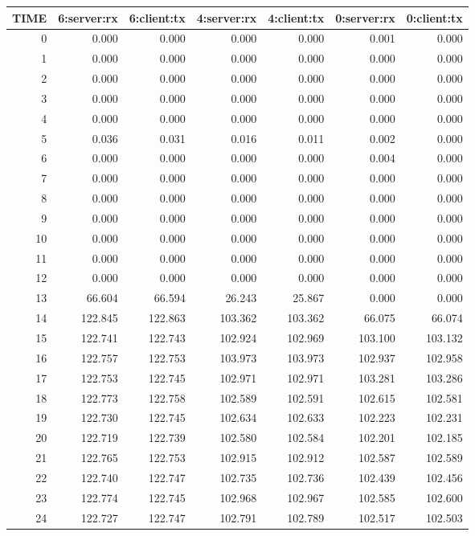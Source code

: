 \begin{tabular}{|rrrrrrr|}
\hline
TIME & 6:server:rx & 6:client:tx & 4:server:rx & 4:client:tx & 0:server:rx & 0:client:tx\\
\hline
0 & 0.000 & 0.000 & 0.000 & 0.000 & 0.001 & 0.000\\
1 & 0.000 & 0.000 & 0.000 & 0.000 & 0.000 & 0.000\\
2 & 0.000 & 0.000 & 0.000 & 0.000 & 0.000 & 0.000\\
3 & 0.000 & 0.000 & 0.000 & 0.000 & 0.000 & 0.000\\
4 & 0.000 & 0.000 & 0.000 & 0.000 & 0.000 & 0.000\\
5 & 0.036 & 0.031 & 0.016 & 0.011 & 0.002 & 0.000\\
6 & 0.000 & 0.000 & 0.000 & 0.000 & 0.004 & 0.000\\
7 & 0.000 & 0.000 & 0.000 & 0.000 & 0.000 & 0.000\\
8 & 0.000 & 0.000 & 0.000 & 0.000 & 0.000 & 0.000\\
9 & 0.000 & 0.000 & 0.000 & 0.000 & 0.000 & 0.000\\
10 & 0.000 & 0.000 & 0.000 & 0.000 & 0.000 & 0.000\\
11 & 0.000 & 0.000 & 0.000 & 0.000 & 0.000 & 0.000\\
12 & 0.000 & 0.000 & 0.000 & 0.000 & 0.000 & 0.000\\
13 & 66.604 & 66.594 & 26.243 & 25.867 & 0.000 & 0.000\\
14 & 122.845 & 122.863 & 103.362 & 103.362 & 66.075 & 66.074\\
15 & 122.741 & 122.743 & 102.924 & 102.969 & 103.100 & 103.132\\
16 & 122.757 & 122.753 & 103.973 & 103.973 & 102.937 & 102.958\\
17 & 122.753 & 122.745 & 102.971 & 102.971 & 103.281 & 103.286\\
18 & 122.773 & 122.758 & 102.589 & 102.591 & 102.615 & 102.581\\
19 & 122.730 & 122.745 & 102.634 & 102.633 & 102.223 & 102.231\\
20 & 122.719 & 122.739 & 102.580 & 102.584 & 102.201 & 102.185\\
21 & 122.765 & 122.753 & 102.915 & 102.912 & 102.587 & 102.589\\
22 & 122.740 & 122.747 & 102.735 & 102.736 & 102.439 & 102.456\\
23 & 122.774 & 122.745 & 102.968 & 102.967 & 102.585 & 102.600\\
24 & 122.727 & 122.747 & 102.791 & 102.789 & 102.517 & 102.503\\

\end{tabular}
